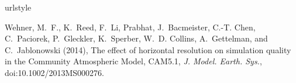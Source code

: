 \documentclass[ms]{agutexSI}
\begin{document}
\begin{article}
%
\begin{thebibliography}{1}
\providecommand{\natexlab}[1]{#1}
\expandafter\ifx\csname urlstyle\endcsname\relax
  \providecommand{\doi}[1]{doi:\discretionary{}{}{}#1}\else
  \providecommand{\doi}{doi:\discretionary{}{}{}\begingroup
  \urlstyle{rm}\Url}\fi
  
Wehner, M.~F., K.~Reed, F.~Li, Prabhat, J.~Bacmeister, C.-T. Chen, C.~Paciorek,
  P.~Gleckler, K.~Sperber, W.~D. Collins, A.~Gettelman, and C.~Jablonowski
  (2014), {The effect of horizontal resolution on simulation quality in the
  Community Atmospheric Model, CAM5.1}, \textit{J. Model. Earth. Sys.},
  \doi{10.1002/2013MS000276}.
  
\end{thebibliography}
%
%
%
%
%
%
%
%


%
%
%
%


\end{article}
\end{document}

